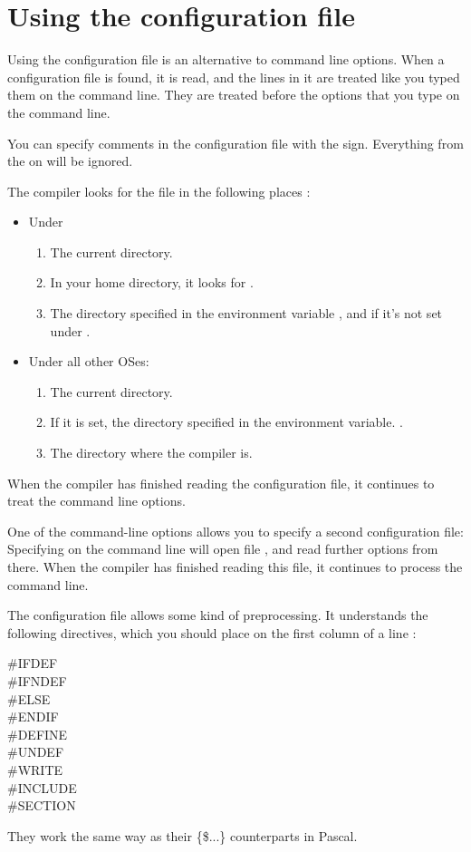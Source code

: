 \documentclass{report}
\begin{document}
\section{Using the configuration file}
\label{se:config_file}
Using the configuration file  is an alternative to command
line options. When a configuration file is found, it is read, and the lines
in it are treated like you typed them on the command line. They are treated
before the options that you type on the command line.

You can specify comments in the configuration file with the \var{\#} sign.
Everything from the \var{\#} on will be ignored.

The compiler looks for the  file in the following places :
\begin{itemize} 
\item Under \linux
\begin{enumerate}
\item The current directory.
\item In your home directory, it looks for .
\item The directory specified in the environment variable 
, and if it's not set under .
\end{enumerate}
\item Under all other OSes:
\begin{enumerate}
\item The current directory.
\item If it is set, the directory specified in the environment variable.
.
\item The directory where the compiler is. 
\end{enumerate}
\end{itemize}
When the compiler has finished reading the configuration file, it continues
to treat the command line options.

One of the command-line options allows you to specify a second configuration
file: Specifying  on the command line will open file ,
and read further options from there. When the compiler has finished reading
this file, it continues to process the command line.

The configuration file allows some kind of preprocessing. It understands the
following directives, which you should place on the first column of a line :
\begin{description}
\item [\#IFDEF]
\item [\#IFNDEF]
\item [\#ELSE]
\item [\#ENDIF]
\item [\#DEFINE]
\item [\#UNDEF]
\item [\#WRITE]
\item [\#INCLUDE]
\item [\#SECTION]
\end{description}
They work the same way as their \{\$...\}  counterparts in Pascal.
\end{document}
